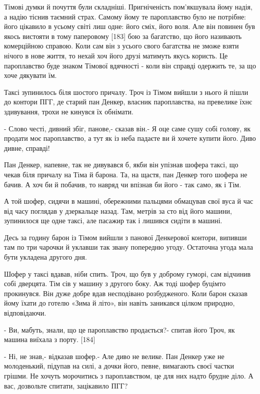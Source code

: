 Тімові думки й почуття були складніші. Пригніченість пом'якшувала йому надія, а надію тіснив таємний страх. Самому йому те пароплавство було не потрібне: його цікавило в усьому світі лиш одне: його сміх, його воля. Але він повинен був якось вистояти в тому паперовому [183] бою за багатство, що його називають комерційною справою. Коли сам він з усього свого багатства не зможе взяти нічого в нове життя, то нехай хоч його друзі матимуть якусь користь. Це пароплавство буде знаком Тімової вдячності - коли він справді одержить те, за що хоче дякувати їм.

Таксі зупинилось біля шостого причалу. Троч із Тімом вийшли з нього й пішли до контори ПГГ, де старий пан Денкер, власник пароплавства, на превелике їхнє здивування, трохи не кинувся їх обнімати.

- Слово честі, дивний збіг, панове,- сказав він.- Я оце саме сушу собі голову, як продати моє пароплавство, а тут як із неба падаєте ви й хочете купити його. Диво дивне, справді!

Пан Денкер, напевне, так не дивувався б, якби він упізнав шофера таксі, що чекав біля причалу на Тіма й барона. Та, на щастя, пан Денкер того шофера не бачив. А хоч би й побачив, то навряд чи впізнав би його - так само, як і Тім.

А той шофер, сидячи в машині, обережними пальцями обмацував свої вуса й час від часу поглядав у дзеркальце назад. Там, метрів за сто від його машини, зупинилося ще одне таксі, але пасажир так і лишився сидіти в машині.

Десь за годину барон із Тімом вийшли з панової Денкерової контори, випивши там по три чарочки й уклавши так звану попередню угоду. Остаточна угода мала бути укладена другого дня.

Шофер у таксі вдавав, ніби спить. Троч, що був у доброму гуморі, сам відчинив собі дверцята. Тім сів у машину з другого боку. Аж тоді шофер буцімто прокинувся. Він дуже добре вдав несподівано розбудженого. Коли барон сказав йому їхати до готелю «Зима й літо», він навіть заникався цілком природно, відповідаючи.

- Ви, мабуть, знали, що це пароплавство продається?- спитав його Троч, як машина виїхала з порту. [184]

- Ні, не знав,- відказав шофер.- Але диво не велике. Пан Денкер уже не молоденький, підупав на силі, а дочки його, певне, вимагають своєї частки грішми. Не хочуть морочитись з пароплавством, це для них надто брудне діло. А вас, дозвольте спитати, зацікавило ПГГ?


